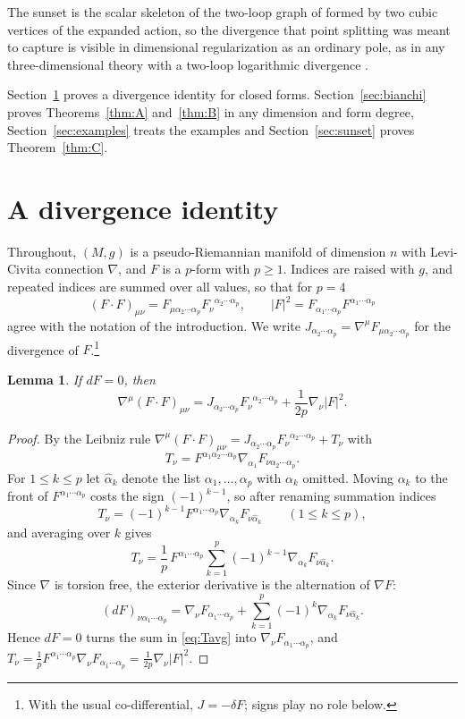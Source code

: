 \documentclass[11pt]{amsart}
\newtheorem{lemma}[theorem]{Lemma}
\theoremstyle{definition}
\newcommand{\FF}{(F\!\cdot\! F)}
\begin{document}
The sunset is the scalar skeleton of the two-loop graph of \cite{Kak00} formed by two cubic vertices of the expanded action, so the divergence that point splitting was meant to capture is visible in dimensional regularization as an ordinary pole, as in any three-dimensional theory with a two-loop logarithmic divergence \cite{tHV72}.

Section~\ref{sec:identity} proves a divergence identity for closed forms. Section~\ref{sec:bianchi} proves Theorems~\ref{thm:A} and~\ref{thm:B} in any dimension and form degree, Section~\ref{sec:examples} treats the examples and Section~\ref{sec:sunset} proves Theorem~\ref{thm:C}.

\section{A divergence identity}\label{sec:identity}

Throughout, $(M,g)$ is a pseudo-Riemannian manifold of dimension $n$ with Levi-Civita connection $\nabla$, and $F$ is a $p$-form with $p\ge1$. Indices are raised with $g$, and repeated indices are summed over all values, so that for $p=4$
\[
\FF_{\mu\nu}=F_{\mu\alpha_2\cdots\alpha_p}F_\nu{}^{\alpha_2\cdots\alpha_p},\qquad |F|^2=F_{\alpha_1\cdots\alpha_p}F^{\alpha_1\cdots\alpha_p}
\]
agree with the notation of the introduction. We write $J_{\alpha_2\cdots\alpha_p}=\nabla^\mu F_{\mu\alpha_2\cdots\alpha_p}$ for the divergence of $F$.\footnote{With the usual co-differential, $J=-\delta F$; signs play no role below.}

\begin{lemma}\label{lem:div}
If $dF=0$, then
\[
\nabla^\mu\FF_{\mu\nu}=J_{\alpha_2\cdots\alpha_p}F_\nu{}^{\alpha_2\cdots\alpha_p}+\frac{1}{2p}\nabla_\nu|F|^2 .
\]
\end{lemma}

\begin{proof}
By the Leibniz rule $\nabla^\mu\FF_{\mu\nu}=J_{\alpha_2\cdots\alpha_p}F_\nu{}^{\alpha_2\cdots\alpha_p}+T_\nu$ with
\[
T_\nu=F^{\alpha_1\alpha_2\cdots\alpha_p}\nabla_{\alpha_1}F_{\nu\alpha_2\cdots\alpha_p}.
\]
For $1\le k\le p$ let $\widehat{\alpha}_k$ denote the list $\alpha_1,\dots,\alpha_p$ with $\alpha_k$ omitted. Moving $\alpha_k$ to the front of $F^{\alpha_1\cdots\alpha_p}$ costs the sign $(-1)^{k-1}$, so after renaming summation indices
\[
T_\nu=(-1)^{k-1}F^{\alpha_1\cdots\alpha_p}\nabla_{\alpha_k}F_{\nu\widehat{\alpha}_k}\qquad(1\le k\le p),
\]
and averaging over $k$ gives
\begin{equation}\label{eq:Tavg}
T_\nu=\frac1p\,F^{\alpha_1\cdots\alpha_p}\sum_{k=1}^{p}(-1)^{k-1}\nabla_{\alpha_k}F_{\nu\widehat{\alpha}_k}.
\end{equation}
Since $\nabla$ is torsion free, the exterior derivative is the alternation of $\nabla F$:
\[
(dF)_{\nu\alpha_1\cdots\alpha_p}=\nabla_\nu F_{\alpha_1\cdots\alpha_p}+\sum_{k=1}^p(-1)^k\nabla_{\alpha_k}F_{\nu\widehat{\alpha}_k}.
\]
Hence $dF=0$ turns the sum in \eqref{eq:Tavg} into $\nabla_\nu F_{\alpha_1\cdots\alpha_p}$, and $T_\nu=\frac1pF^{\alpha_1\cdots\alpha_p}\nabla_\nu F_{\alpha_1\cdots\alpha_p}=\frac{1}{2p}\nabla_\nu|F|^2$.
\end{proof}
\end{document}
